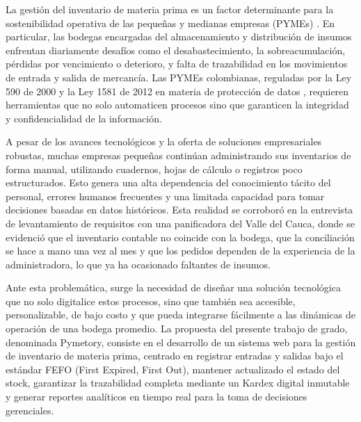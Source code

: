 

La gestión del inventario de materia prima es un factor determinante para la sostenibilidad operativa de las pequeñas y medianas empresas (PYMEs) \cite{ley590,bbva2024mipymes}. En particular, las bodegas encargadas del almacenamiento y distribución de insumos enfrentan diariamente desafíos como el desabastecimiento, la sobreacumulación, pérdidas por vencimiento o deterioro, y falta de trazabilidad en los movimientos de entrada y salida de mercancía. Las PYMEs colombianas, reguladas por la Ley 590 de 2000 y la Ley 1581 de 2012 en materia de protección de datos \cite{ley1581}, requieren herramientas que no solo automaticen procesos sino que garanticen la integridad y confidencialidad de la información.

A pesar de los avances tecnológicos y la oferta de soluciones empresariales robustas, muchas empresas pequeñas continúan administrando sus inventarios de forma manual, utilizando cuadernos, hojas de cálculo o registros poco estructurados. Esto genera una alta dependencia del conocimiento tácito del personal, errores humanos frecuentes y una limitada capacidad para tomar decisiones basadas en datos históricos. Esta realidad se corroboró en la entrevista de levantamiento de requisitos con una panificadora del Valle del Cauca, donde se evidenció que el inventario contable no coincide con la bodega, que la conciliación se hace a mano una vez al mes y que los pedidos dependen de la experiencia de la administradora, lo que ya ha ocasionado faltantes de insumos.

Ante esta problemática, surge la necesidad de diseñar una solución tecnológica que no solo digitalice estos procesos, sino que también sea accesible, personalizable, de bajo costo y que pueda integrarse fácilmente a las dinámicas de operación de una bodega promedio. La propuesta del presente trabajo de grado, denominada Pymetory, consiste en el desarrollo de un sistema web para la gestión de inventario de materia prima, centrado en registrar entradas y salidas bajo el estándar FEFO (First Expired, First Out), mantener actualizado el estado del stock, garantizar la trazabilidad completa mediante un Kardex digital inmutable y generar reportes analíticos en tiempo real para la toma de decisiones gerenciales.

